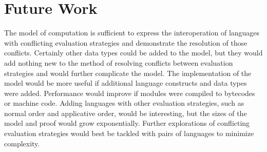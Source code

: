 \chapter{Future Work}

The model of computation is sufficient to express the interoperation of languages with conflicting evaluation strategies and demonstrate the resolution of those conflicts.  Certainly other data types could be added to the model, but they would add nothing new to the method of resolving conflicts between evaluation strategies and would further complicate the model.  The implementation of the model would be more useful if additional language constructs and data types were added.  Performance would improve if modules were compiled to bytecodes or machine code.  Adding languages with other evaluation strategies, such as normal order and applicative order, would be interesting, but the sizes of the model and proof would grow exponentially.  Further explorations of conflicting evaluation strategies would best be tackled with pairs of languages to minimize complexity.